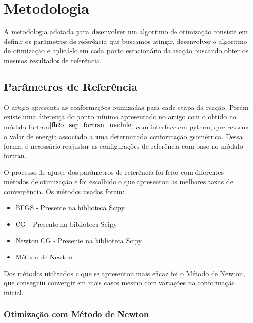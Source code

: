 \section{Metodologia}
\label{sec:methodology}

A metodologia adotada para desenvolver um algoritmo de otimização consiste em definir os parâmetros de referência que buscamos atingir, desenvolver o algoritmo de otimização e aplicá-lo em cada ponto estacionário da reação buscando obter os mesmos resultados de referência.

\subsection{Parâmetros de Referência}

O artigo \cite{fh2o_first_sep} apresenta as conformações otimizadas para cada etapa da reação. Porém existe uma diferença do ponto mínimo apresentado no artigo com o obtido no módulo fortran$^{ \cite{fh2o_sep_fortran_module} }$ com interface em python, que retorna o valor de energia associado a uma determinada conformação geométrica. Dessa forma, é necessário reajustar as configurações de referência com base no módulo fortran.

O processo de ajuste dos parâmetros de referência foi feito com diferentes métodos de otimização e foi escolhido o que apresentou as melhores taxas de convergência. Os métodos usados foram:
%
\begin{itemize}[itemsep=0pt,parsep=0pt]
  \item BFGS - Presente na biblioteca Scipy \cite{scipy}
  \item CG - Presente na biblioteca Scipy \cite{scipy}
  \item Newton CG - Presente na biblioteca Scipy \cite{scipy}
  \item Método de Newton
\end{itemize}
%
Dos métodos utilizados o que se apresentou mais eficaz foi o Método de Newton, que conseguiu convergir em mais casos mesmo com variações na conformação inicial.

\subsubsection{Otimização com Método de Newton}

